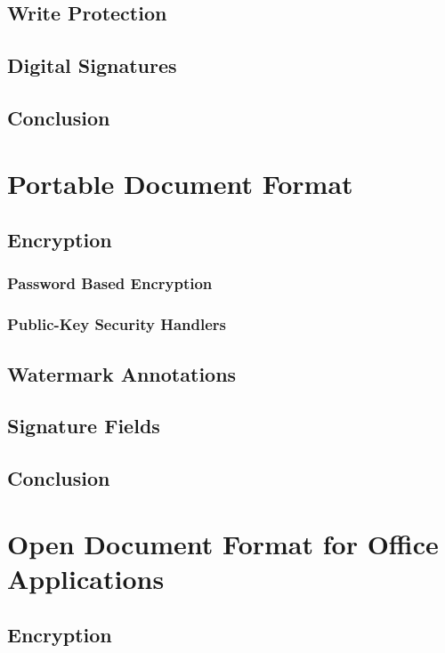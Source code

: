 \documentclass[11pt,oneside]{fithesis2}
\begin{document}
\section{Write Protection}

\section{Digital Signatures}

\section{Conclusion}

\chapter{Portable Document Format}

\section{Encryption}

\subsection{Password Based Encryption}

\subsection{Public-Key Security Handlers}

\section{Watermark Annotations}

\section{Signature Fields}

\section{Conclusion}

\chapter{Open Document Format for Office Applications}

\section{Encryption}
\end{document}
